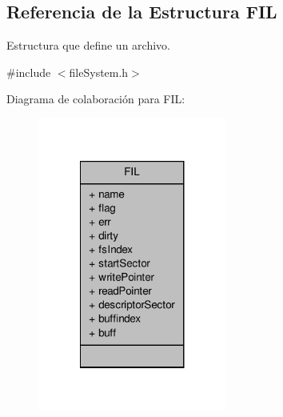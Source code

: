 \hypertarget{structFIL}{\subsection{Referencia de la Estructura F\+I\+L}
\label{structFIL}
}


Estructura que define un archivo.  




{\ttfamily \#include $<$file\+System.\+h$>$}



Diagrama de colaboración para F\+I\+L\+:\nopagebreak
\begin{figure}[H]
\begin{center}
\leavevmode
\includegraphics[width=176pt]{structFIL__coll__graph}
\end{center}
\end{figure}
